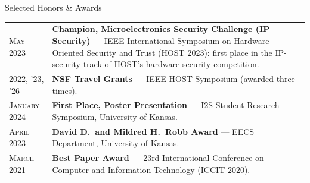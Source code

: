 \begin{rSection}{Selected Honors \& Awards}

\begin{tabular}{lp{15.8cm}}
    \textsc{May 2023} & \href{http://www.hostsymposium.org/host_2023awards.php}{\textbf{Champion, Microelectronics Security Challenge (IP Security)}} --- IEEE International Symposium on Hardware Oriented Security and Trust (HOST 2023): first place in the IP-security track of HOST's hardware security competition. \\

    \textsc{2022, '23, '26} & \textbf{NSF Travel Grants} --- IEEE HOST Symposium (awarded three times). \\

    \textsc{January 2024} & \textbf{First Place, Poster Presentation} --- I2S Student Research Symposium, University of Kansas. \\

    \textsc{April 2023} & \textbf{David D.\ and Mildred H.\ Robb Award} --- EECS Department, University of Kansas. \\

    \textsc{March 2021} & \textbf{Best Paper Award} --- 23rd International Conference on Computer and Information Technology (ICCIT 2020). \\
\end{tabular}

\end{rSection}

